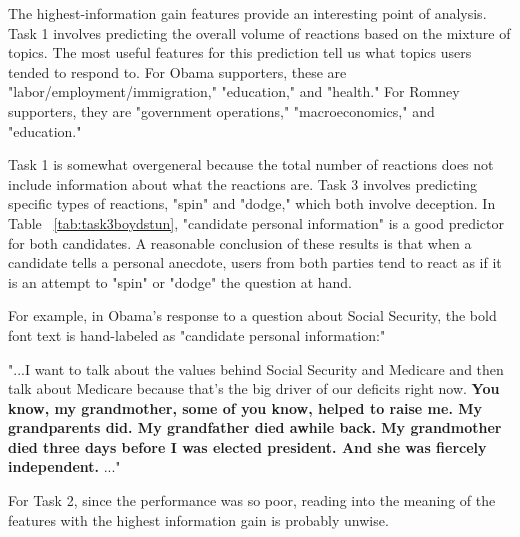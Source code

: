 The highest-information gain features provide an interesting point of analysis. Task 1 involves predicting the overall volume of reactions based on the mixture of topics. The most useful features for this prediction tell us what topics users tended to respond to. For Obama supporters, these are "labor/employment/immigration," "education," and "health." For Romney supporters, they are "government operations," "macroeconomics," and "education."

Task 1 is somewhat overgeneral because the total number of reactions does not include information about what the reactions are. Task 3 involves predicting specific types of reactions, "spin" and "dodge," which both involve deception. In Table ~\ref{tab:task3boydstun}, "candidate personal information" is a good predictor for both candidates. A reasonable conclusion of these results is that when a candidate tells a personal anecdote, users from both parties tend to react as if it is an attempt to "spin" or "dodge" the question at hand.

For example, in Obama's response to a question about Social Security, the bold font text is hand-labeled as "candidate personal information:"

\footnotesize
\vspace*{.2in}
"...I want to talk about the values behind Social Security and Medicare and then talk about Medicare because that's the big driver of our deficits right now. \textbf{You know, my grandmother, some of you know, helped to raise me. My grandparents did. My grandfather died awhile back. My grandmother died three days before I was elected president. And she was fiercely independent.} ..."
\vspace*{.2in}
\normalsize

For Task 2, since the performance was so poor, reading into the meaning of the features with the highest information gain is probably unwise.

